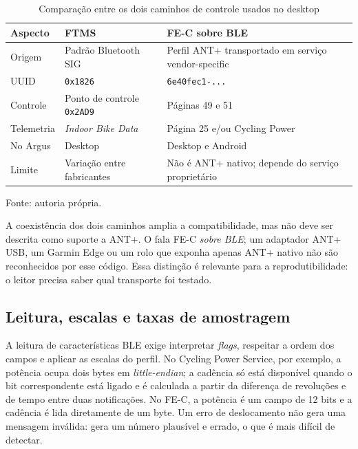 \begin{table}[htbp]
    \centering
    \caption{Comparação entre os dois caminhos de controle usados no desktop}
    \label{tab:ftms-fec}
    \small
    \begin{tabular}{@{}>{\raggedright\arraybackslash}p{2.6cm}
        >{\raggedright\arraybackslash}p{4.8cm}
        >{\raggedright\arraybackslash}p{5.8cm}@{}}
        \toprule
        \textbf{Aspecto} & \textbf{FTMS} & \textbf{FE-C sobre BLE} \\
        \midrule
        Origem & Padrão Bluetooth SIG & Perfil ANT+ transportado em serviço
        vendor-specific \\
        UUID & \texttt{0x1826} & \texttt{6e40fec1-...} \\
        Controle & Ponto de controle \texttt{0x2AD9} & Páginas 49 e 51 \\
        Telemetria & \textit{Indoor Bike Data} & Página 25 e/ou Cycling Power \\
        No Argus & Desktop & Desktop e Android \\
        Limite & Variação entre fabricantes & Não é ANT+ nativo; depende do
        serviço proprietário \\
        \bottomrule
    \end{tabular}
    \vspace{0.2cm}
    \par\small Fonte: autoria própria.
\end{table}

A coexistência dos dois caminhos amplia a compatibilidade, mas não deve ser
descrita como suporte a ANT+. O \argus{} fala FE-C \emph{sobre BLE}; um
adaptador ANT+ USB, um Garmin Edge ou um rolo que exponha apenas ANT+ nativo
não são reconhecidos por esse código. Essa distinção é relevante para a
reprodutibilidade: o leitor precisa saber qual transporte foi testado.

\subsection{Leitura, escalas e taxas de amostragem}
\label{sec:leitura-ble}

A leitura de características BLE exige interpretar \textit{flags}, respeitar a
ordem dos campos e aplicar as escalas do perfil. No Cycling Power Service, por
exemplo, a potência ocupa dois bytes em \textit{little-endian}; a cadência só
está disponível quando o bit correspondente está ligado e é calculada a partir
da diferença de revoluções e de tempo entre duas notificações. No FE-C, a
potência é um campo de 12 bits e a cadência é lida diretamente de um byte. Um
erro de deslocamento não gera uma mensagem inválida: gera um número plausível e
errado, o que é mais difícil de detectar.

